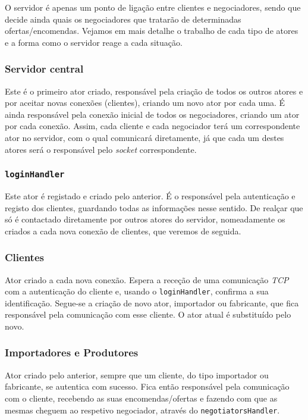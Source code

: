 \documentclass[a4paper]{report}
\begin{document}
	O servidor é apenas um ponto de ligação entre clientes e negociadores, sendo que decide ainda quais os negociadores que tratarão de determinadas ofertas/encomendas.
	Vejamos em mais detalhe o trabalho de cada tipo de atores e a forma como o servidor reage a cada situação.

	\subsubsection{Servidor central}
	Este é o primeiro ator criado, responsável pela criação de todos os outros atores e por aceitar novas conexões (clientes), criando um novo ator por cada uma. 
	É ainda responsável pela conexão inicial de todos os negociadores, criando um ator por cada conexão.
	Assim, cada cliente e cada negociador terá um correspondente ator no servidor, com o qual comunicará diretamente, já que cada um destes atores será o responsável pelo \textit{socket} correspondente.

	\subsubsection{\texttt{loginHandler}}
	Este ator é registado e criado pelo anterior. É o responsável pela autenticação e registo dos clientes, guardando todas as informações nesse sentido. 
	De realçar que só é contactado diretamente por outros atores do servidor, nomeadamente os criados a cada nova conexão de clientes, que veremos de seguida.

	\subsubsection{Clientes}
	Ator criado a cada nova conexão. Espera a receção de uma comunicação \textit{TCP} com a autenticação do cliente e, usando o \texttt{loginHandler}, confirma a sua identificação.
	Segue-se a criação de novo ator, importador ou fabricante, que fica responsável pela comunicação com esse cliente. O ator atual é substituído pelo novo.

	\subsubsection{Importadores e Produtores}
	Ator criado pelo anterior, sempre que um cliente, do tipo importador ou fabricante, se autentica com sucesso. 
	Fica então responsável pela comunicação com o cliente, recebendo as suas encomendas/ofertas e fazendo com que as mesmas cheguem ao respetivo negociador, através do \texttt{negotiatorsHandler}.
\end{document}
